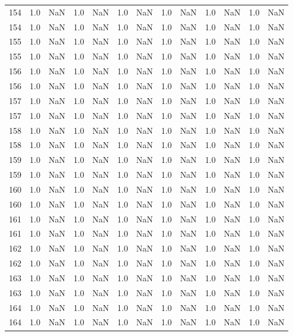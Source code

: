 \begin{tabular}{lrrrrrrrrrrrr}
154 & 1.0 & NaN & 1.0 & NaN & 1.0 & NaN & 1.0 & NaN & 1.0 & NaN & 1.0 & NaN \\
154 & 1.0 & NaN & 1.0 & NaN & 1.0 & NaN & 1.0 & NaN & 1.0 & NaN & 1.0 & NaN \\
155 & 1.0 & NaN & 1.0 & NaN & 1.0 & NaN & 1.0 & NaN & 1.0 & NaN & 1.0 & NaN \\
155 & 1.0 & NaN & 1.0 & NaN & 1.0 & NaN & 1.0 & NaN & 1.0 & NaN & 1.0 & NaN \\
156 & 1.0 & NaN & 1.0 & NaN & 1.0 & NaN & 1.0 & NaN & 1.0 & NaN & 1.0 & NaN \\
156 & 1.0 & NaN & 1.0 & NaN & 1.0 & NaN & 1.0 & NaN & 1.0 & NaN & 1.0 & NaN \\
157 & 1.0 & NaN & 1.0 & NaN & 1.0 & NaN & 1.0 & NaN & 1.0 & NaN & 1.0 & NaN \\
157 & 1.0 & NaN & 1.0 & NaN & 1.0 & NaN & 1.0 & NaN & 1.0 & NaN & 1.0 & NaN \\
158 & 1.0 & NaN & 1.0 & NaN & 1.0 & NaN & 1.0 & NaN & 1.0 & NaN & 1.0 & NaN \\
158 & 1.0 & NaN & 1.0 & NaN & 1.0 & NaN & 1.0 & NaN & 1.0 & NaN & 1.0 & NaN \\
159 & 1.0 & NaN & 1.0 & NaN & 1.0 & NaN & 1.0 & NaN & 1.0 & NaN & 1.0 & NaN \\
159 & 1.0 & NaN & 1.0 & NaN & 1.0 & NaN & 1.0 & NaN & 1.0 & NaN & 1.0 & NaN \\
160 & 1.0 & NaN & 1.0 & NaN & 1.0 & NaN & 1.0 & NaN & 1.0 & NaN & 1.0 & NaN \\
160 & 1.0 & NaN & 1.0 & NaN & 1.0 & NaN & 1.0 & NaN & 1.0 & NaN & 1.0 & NaN \\
161 & 1.0 & NaN & 1.0 & NaN & 1.0 & NaN & 1.0 & NaN & 1.0 & NaN & 1.0 & NaN \\
161 & 1.0 & NaN & 1.0 & NaN & 1.0 & NaN & 1.0 & NaN & 1.0 & NaN & 1.0 & NaN \\
162 & 1.0 & NaN & 1.0 & NaN & 1.0 & NaN & 1.0 & NaN & 1.0 & NaN & 1.0 & NaN \\
162 & 1.0 & NaN & 1.0 & NaN & 1.0 & NaN & 1.0 & NaN & 1.0 & NaN & 1.0 & NaN \\
163 & 1.0 & NaN & 1.0 & NaN & 1.0 & NaN & 1.0 & NaN & 1.0 & NaN & 1.0 & NaN \\
163 & 1.0 & NaN & 1.0 & NaN & 1.0 & NaN & 1.0 & NaN & 1.0 & NaN & 1.0 & NaN \\
164 & 1.0 & NaN & 1.0 & NaN & 1.0 & NaN & 1.0 & NaN & 1.0 & NaN & 1.0 & NaN \\
164 & 1.0 & NaN & 1.0 & NaN & 1.0 & NaN & 1.0 & NaN & 1.0 & NaN & 1.0 & NaN \\

\end{tabular}
